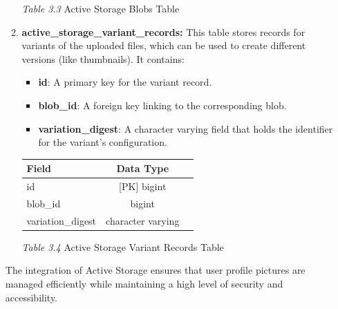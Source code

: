 \begin{enumerate}
\begin{enumerate}
\begin{table}[h!]
            \vspace{0.3cm} %
            \small\centerline{\textit{Table 3.3} Active Storage Blobs Table} %
            \label{tab:active_storage_blobs}
            \end{table}
        
            \item \textbf{active\_storage\_variant\_records:} This table stores records for variants of the uploaded files, which can be used to create different versions (like thumbnails). It contains:
            \begin{itemize}
                \item \textbf{id}: A primary key for the variant record.
                \item \textbf{blob\_id}: A foreign key linking to the corresponding blob.
                \item \textbf{variation\_digest}: A character varying field that holds the identifier for the variant's configuration.
            \end{itemize}
            
            \bigskip
            \begin{table}[h!]
            \centering
            \begin{tabular}{lcc}
                \hline
                \textbf{Field}              & \textbf{Data Type}                 \\ \hline
                id                          & [PK] bigint                        \\ 
                blob\_id                    & bigint                             \\ 
                variation\_digest           & character varying                  \\ \hline
            \end{tabular}
            
            \vspace{0.3cm} %
            \small\centerline{\textit{Table 3.4} Active Storage Variant Records Table} %
            \label{tab:active_storage_variant_records}
            \end{table}
        \end{enumerate}
        
        The integration of Active Storage ensures that user profile pictures are managed efficiently while maintaining a high level of security and accessibility.


\end{enumerate}
